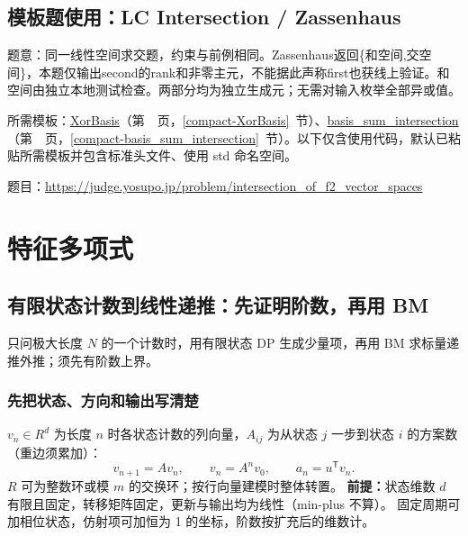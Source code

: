 

\Needspace{520pt}

\subsection*{模板题使用：LC Intersection / Zassenhaus}

\label{usage-example-179}

题意：同一线性空间求交题，约束与前例相同。Zassenhaus返回\{和空间,交空间\}，本题仅输出second的rank和非零主元，不能据此声称first也获线上验证。和空间由独立本地测试检查。两部分均为独立生成元；无需对输入枚举全部异或值。

所需模板：\hyperref[compact-XorBasis]{XorBasis}（第~\pageref{compact-XorBasis}~页，\ref{compact-XorBasis}~节）、\hyperref[compact-basis_sum_intersection]{basis\_\allowbreak{}sum\_\allowbreak{}intersection}（第~\pageref{compact-basis_sum_intersection}~页，\ref{compact-basis_sum_intersection}~节）。以下仅含使用代码，默认已粘贴所需模板并包含标准头文件、使用 std 命名空间。

题目：\url{https://judge.yosupo.jp/problem/intersection_of_f2_vector_spaces}



\newpage

\section{特征多项式}

\subsection{有限状态计数到线性递推：先证明阶数，再用 BM}\label{knowledge-state-recurrence}
只问极大长度 $N$ 的一个计数时，用有限状态 DP 生成少量项，再用 BM 求标量递推外推；须先有阶数上界。

\subsubsection{先把状态、方向和输出写清楚}
$v_n\in R^d$ 为长度 $n$ 时各状态计数的列向量，$A_{ij}$ 为从状态 $j$ 一步到状态 $i$ 的方案数（重边须累加）：
\[
v_{n+1}=Av_n,\qquad v_n=A^nv_0,\qquad a_n=u^{\mathsf T}v_n.
\]
$R$ 可为整数环或模 $m$ 的交换环；按行向量建模时整体转置。
\textbf{前提：}状态维数 $d$ 有限且固定，转移矩阵固定，更新与输出均为线性（min-plus 不算）。
固定周期可加相位状态，仿射项可加恒为 1 的坐标，阶数按扩充后的维数计。

